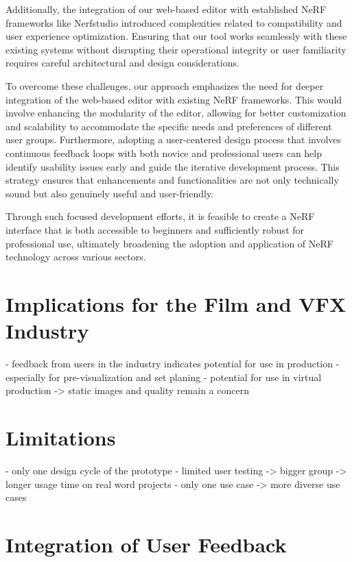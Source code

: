 Additionally, the integration of our web-based editor with established NeRF frameworks like Nerfstudio introduced complexities related to compatibility and user experience optimization. Ensuring that our tool works seamlessly with these existing systems without disrupting their operational integrity or user familiarity requires careful architectural and design considerations.

To overcome these challenges, our approach emphasizes the need for deeper integration of the web-based editor with existing NeRF frameworks. This would involve enhancing the modularity of the editor, allowing for better customization and scalability to accommodate the specific needs and preferences of different user groups. Furthermore, adopting a user-centered design process that involves continuous feedback loops with both novice and professional users can help identify usability issues early and guide the iterative development process. This strategy ensures that enhancements and functionalities are not only technically sound but also genuinely useful and user-friendly.

Through such focused development efforts, it is feasible to create a NeRF interface that is both accessible to beginners and sufficiently robust for professional use, ultimately broadening the adoption and application of NeRF technology across various sectors.


\section{Implications for the Film and VFX Industry}
\label{sec:discussion:implications}

- feedback from users in the industry indicates potential for use in production
- especially for pre-visualization and set planing
- potential for use in virtual production -> static images and quality remain a concern

\section{Limitations}
\label{sec:discussion:limitations}

- only one design cycle of the prototype
- limited user testing -> bigger group -> longer usage time on real word projects
- only one use case -> more diverse use cases

\section{Integration of User Feedback}
\label{sec:discussion:user-feedback}

